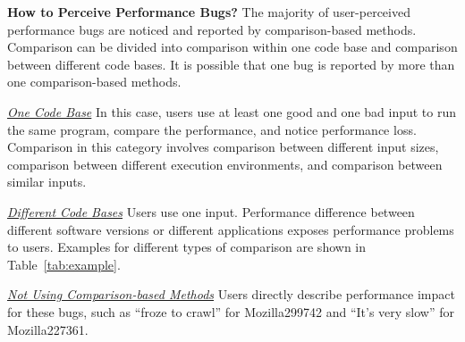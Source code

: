{\bf How to Perceive Performance Bugs?}
The majority of user-perceived performance bugs are noticed and reported by comparison-based methods. 
Comparison can be divided into comparison within one code base
and comparison between different code bases. 
It is possible that one bug is reported by more than one comparison-based methods. 

\underline{\it One Code Base} In this case, users use at least one good and one bad input 
to run the same program, compare the performance, and notice performance loss. 
Comparison in this category involves comparison between different input sizes, 
comparison between different execution environments, 
and comparison between similar inputs. 

\underline{\it Different Code Bases} 
Users use one input.
Performance difference between different software versions or different applications exposes performance problems to users. 
Examples for different types of comparison are shown in Table~\ref{tab:example}.

\underline{\it Not Using Comparison-based Methods}
Users directly describe performance impact for these bugs, 
such as ``froze to crawl'' for Mozilla299742 and ``It’s very slow'' for Mozilla227361. 




